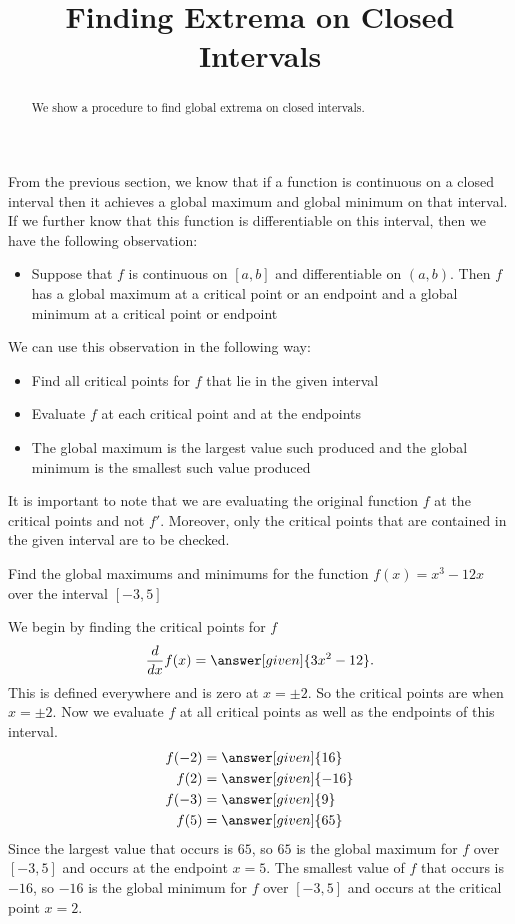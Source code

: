 \documentclass{ximera}
\title[Dig-In:]{Finding Extrema on Closed Intervals}
\begin{document}
\begin{abstract}
  We show a procedure to find global extrema on closed intervals.
\end{abstract}
\maketitle

From the previous section, we know that if a function is continuous on a closed interval then it achieves a global maximum and 
global minimum on that interval. If we further know that this function is differentiable on this interval, then we have the following observation:

\begin{itemize}
\item Suppose that $f$ is continuous on $[a,b]$ and differentiable on $(a,b)$. Then $f$ has a global maximum at a critical point or an endpoint and a global minimum at a critical point or endpoint
\end{itemize}

We can use this observation in the following way:

\begin{itemize}
\item Find all critical points for $f$ that lie in the given interval
\item Evaluate $f$ at each critical point and at the endpoints
\item The global maximum is the largest value such produced and the global minimum is the smallest such value produced
\end{itemize}

It is important to note that we are evaluating the original function $f$ at the critical points and not $f'$. Moreover, only the critical points that
are contained in the given interval are to be checked.


\begin{example}
Find the global maximums and minimums for the function 
$f(x)=x^3-12x$ over the interval $[-3,5]$
\begin{explanation} 
We begin by finding the critical points for $f$
\[
\ddx f(x)=\answer[given]{3x^2-12}.
\] 
This is defined everywhere and is zero at $x=\pm 2$. So the critical
points are when $x=\pm 2$. 
Now we evaluate $f$ at all critical points as well as the endpoints of this interval.
\begin{align*}
f(-2) &= \answer[given]{16} \\ 
f(2) &= \answer[given]{-16} \\ 
f(-3) &= \answer[given]{9} \\ 
f(5) &= \answer[given]{65} 
\end{align*}
Since the largest value that occurs is $65$, so $65$ is the global maximum for $f$ over $[-3,5]$ and occurs at the endpoint $x=5$. 
The smallest value of $f$ that occurs is $-16$, so $-16$ is the global minimum for $f$ over $[-3,5]$ and occurs at the critical point $x=2$.
\end{explanation}
\end{example}
\end{document}
